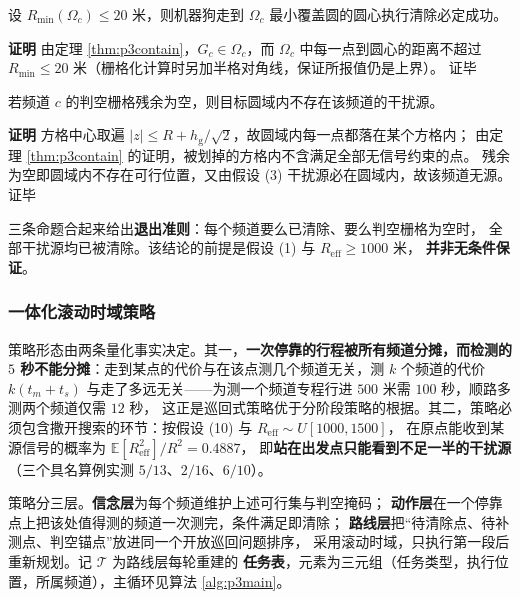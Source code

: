 \documentclass[withoutpreface, bwprint]{cumcmthesis}
\renewenvironment{proof}{\par\noindent\textbf{证明}\quad}{\hfill 证毕\par\medskip}
\begin{document}
\begin{theorem}[一次清除必定成功]
\label{thm:p3clear}
设 $R_{\min}(\Omega_c)\le 20$ 米，则机器狗走到 $\Omega_c$ 最小覆盖圆的圆心执行清除必定成功。
\end{theorem}

\begin{proof}
由定理 \ref{thm:p3contain}，$G_c\in\Omega_c$，而 $\Omega_c$ 中每一点到圆心的距离不超过
$R_{\min}\le 20$ 米（栅格化计算时另加半格对角线，保证所报值仍是上界）。
\end{proof}

\begin{theorem}[判空的正确性]
\label{thm:p3empty}
若频道 $c$ 的判空栅格残余为空，则目标圆域内不存在该频道的干扰源。
\end{theorem}

\begin{proof}
方格中心取遍 $\lvert z\rvert\le R+h_{\mathrm{g}}/\sqrt2$，故圆域内每一点都落在某个方格内；
由定理 \ref{thm:p3contain} 的证明，被划掉的方格内不含满足全部无信号约束的点。
残余为空即圆域内不存在可行位置，又由假设 (3) 干扰源必在圆域内，故该频道无源。
\end{proof}

三条命题合起来给出\textbf{退出准则}：每个频道要么已清除、要么判空栅格为空时，
全部干扰源均已被清除。该结论的前提是假设 (1) 与 $R_{\mathrm{eff}}\ge 1000$ 米，
\textbf{并非无条件保证}。

\subsubsection{一体化滚动时域策略}

策略形态由两条量化事实决定。其一，\textbf{一次停靠的行程被所有频道分摊，而检测的
$5$ 秒不能分摊}：走到某点的代价与在该点测几个频道无关，测 $k$ 个频道的代价 $k(t_m+t_s)$
与走了多远无关——为测一个频道专程行进 $500$ 米需 $100$ 秒，顺路多测两个频道仅需 $12$ 秒，
这正是巡回式策略优于分阶段策略的根据。其二，策略必须包含撒开搜索的环节：按假设 (10) 与 $R_{\mathrm{eff}}\sim U[1000,1500]$，
在原点能收到某源信号的概率为 $\mathbb{E}[R_{\mathrm{eff}}^{2}]/R^{2}=0.4887$，
即\textbf{站在出发点只能看到不足一半的干扰源}（三个具名算例实测 $5/13$、$2/16$、$6/10$）。

策略分三层。\textbf{信念层}为每个频道维护上述可行集与判空掩码；
\textbf{动作层}在一个停靠点上把该处值得测的频道一次测完，条件满足即清除；
\textbf{路线层}把“待清除点、待补测点、判空锚点”放进同一个开放巡回问题排序，
采用滚动时域，只执行第一段后重新规划。记 $\mathcal{T}$ 为路线层每轮重建的
\textbf{任务表}，元素为三元组（任务类型，执行位置，所属频道），主循环见算法 \ref{alg:p3main}。
\end{document}
